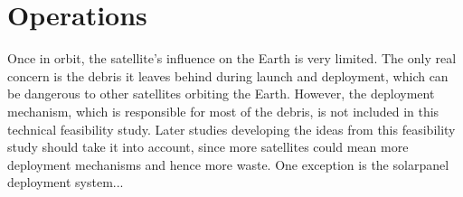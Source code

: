 \section{Operations}
\label{SSOPE}

Once in orbit, the satellite's influence on the Earth is very limited. The only real concern is the debris it leaves behind during launch and deployment, which can be dangerous to other satellites orbiting the Earth.
However, the deployment mechanism, which is responsible for most of the debris, is not included in this technical feasibility study. Later studies developing the ideas from this feasibility study should take it into account, since more satellites could mean more deployment mechanisms and hence more waste. One exception is the solarpanel deployment system...